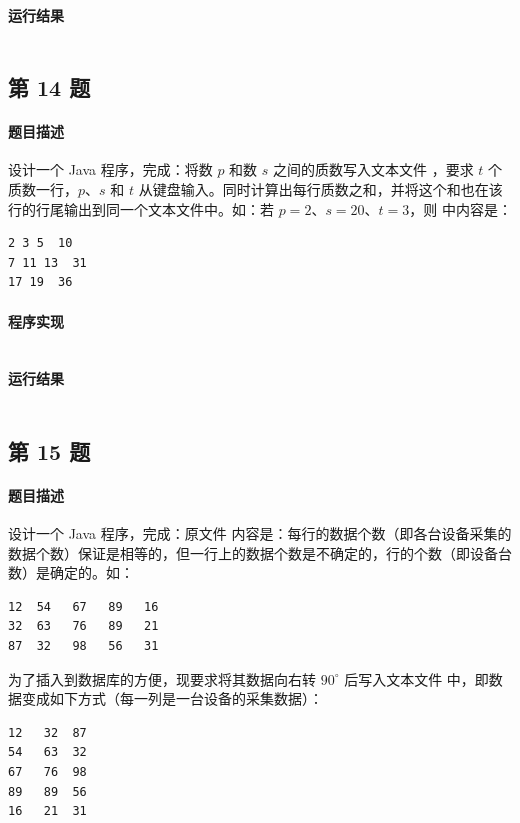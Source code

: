 \documentclass{academics}
\begin{document}
{\paragraph{运行结果} {
    \inputminted{text}{../res/P13.out}
}

\subsection{第 14 题}

\paragraph{题目描述} {
    设计一个 Java 程序，完成：将数 $p$ 和数 $s$ 之间的质数写入文本文件 ，要求 $t$ 个质数一行，$p$、$s$ 和 $t$ 从键盘输入。同时计算出每行质数之和，并将这个和也在该行的行尾输出到同一个文本文件中。如：若 $p = 2$、$s = 20$、$t = 3$，则  中内容是：
    \begin{verbatim}
2 3 5  10
7 11 13  31
17 19  36
\end{verbatim}
}

\paragraph{程序实现} {
    \inputminted[label=PrimeToFile.java]{java}{../src/P14/PrimeToFile.java}
}

\paragraph{运行结果} {
    \inputminted{text}{../res/P14.out}
}

\subsection{第 15 题}

\paragraph{题目描述} {
    设计一个 Java 程序，完成：原文件  内容是：每行的数据个数（即各台设备采集的数据个数）保证是相等的，但一行上的数据个数是不确定的，行的个数（即设备台数）是确定的。如：
    \begin{verbatim}
12  54   67   89   16
32  63   76   89   21
87  32   98   56   31
\end{verbatim}
    为了插入到数据库的方便，现要求将其数据向右转 $90^{\circ}$ 后写入文本文件  中，即数据变成如下方式（每一列是一台设备的采集数据）：
    \begin{verbatim}
12   32  87
54   63  32
67   76  98
89   89  56
16   21  31
\end{verbatim}
}

}
\end{document}
